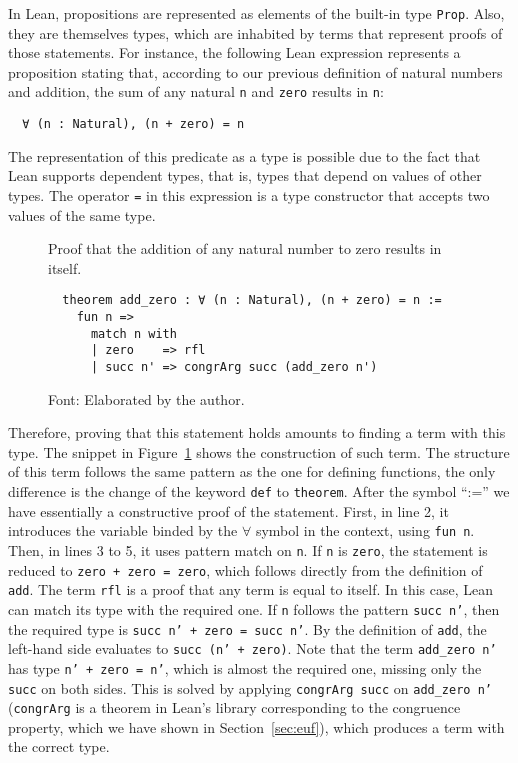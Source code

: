 In Lean, propositions are represented as elements of the built-in type \texttt{Prop}. Also, they are themselves types, which are inhabited by terms that represent proofs of those statements. For instance, the following Lean expression represents a proposition stating that, according to our previous definition of natural numbers and addition, the sum of any natural \texttt{n} and \texttt{zero} results in \texttt{n}:

\begin{verbatim}
  ∀ (n : Natural), (n + zero) = n
\end{verbatim}

The representation of this predicate as a type is possible due to the fact that Lean supports dependent types, that is, types that depend on values of other types. The operator \texttt{=} in this expression is a type constructor that accepts two values of the same type.


\begin{figure}[t]
\caption{Proof that the addition of any natural number to zero results in itself.}\label{addZero}
\begin{verbatim}
  theorem add_zero : ∀ (n : Natural), (n + zero) = n :=
    fun n =>
      match n with
      | zero    => rfl
      | succ n' => congrArg succ (add_zero n')
\end{verbatim}
\caption*{Font: Elaborated by the author.}
\end{figure}

Therefore, proving that this statement holds amounts to finding a term with this type. The snippet in Figure~\ref{addZero} shows the construction of such term.
The structure of this term follows the same pattern as the one for defining functions, the only difference is the change of the keyword \texttt{def} to \texttt{theorem}. After the symbol ``:='' we have essentially a constructive proof of the statement. First, in line 2, it introduces the variable binded by the $\forall$ symbol in the context, using \texttt{fun n}. Then, in lines 3 to 5, it uses pattern match on \texttt{n}. If \texttt{n} is \texttt{zero}, the statement is reduced to \texttt{zero + zero = zero}, which follows directly from the definition of \texttt{add}. The term \texttt{rfl} is a proof that any term is equal to itself. In this case, Lean can match its type with the required one. If \texttt{n} follows the pattern \texttt{succ n'}, then the required type is \texttt{succ n' + zero = succ n'}. By the definition of \texttt{add}, the left-hand side evaluates to \texttt{succ (n' + zero)}.
Note that the term \texttt{add\_zero n'} has type \texttt{n' + zero = n'}, which is almost the required one, missing only the \texttt{succ} on both sides. This is solved by applying \texttt{congrArg succ} on \texttt{add\_zero n'} (\texttt{congrArg} is a theorem in Lean's library corresponding to the congruence property, which we have shown in Section~\ref{sec:euf}), which produces a term with the correct type.


